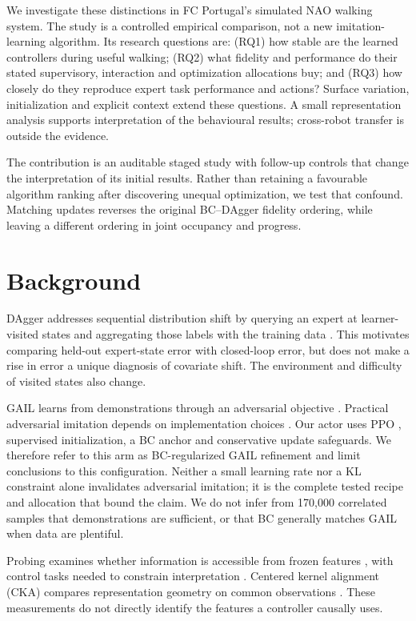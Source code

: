 \documentclass[conference]{IEEEtran}
\begin{document}
We investigate these distinctions in FC Portugal's simulated NAO walking system. The study is a controlled empirical comparison, not a new imitation-learning algorithm. Its research questions are: (RQ1) how stable are the learned controllers during useful walking; (RQ2) what fidelity and performance do their stated supervisory, interaction and optimization allocations buy; and (RQ3) how closely do they reproduce expert task performance and actions? Surface variation, initialization and explicit context extend these questions. A small representation analysis supports interpretation of the behavioural results; cross-robot transfer is outside the evidence.

The contribution is an auditable staged study with follow-up controls that change the interpretation of its initial results. Rather than retaining a favourable algorithm ranking after discovering unequal optimization, we test that confound. Matching updates reverses the original BC--DAgger fidelity ordering, while leaving a different ordering in joint occupancy and progress.

\section{Background}

DAgger addresses sequential distribution shift by querying an expert at learner-visited states and aggregating those labels with the training data \citep{ross2011}. This motivates comparing held-out expert-state error with closed-loop error, but does not make a rise in error a unique diagnosis of covariate shift. The environment and difficulty of visited states also change.

GAIL learns from demonstrations through an adversarial objective \citep{ho2016}. Practical adversarial imitation depends on implementation choices \citep{orsini2021}. Our actor uses PPO \citep{schulman2017}, supervised initialization, a BC anchor and conservative update safeguards. We therefore refer to this arm as BC-regularized GAIL refinement and limit conclusions to this configuration. Neither a small learning rate nor a KL constraint alone invalidates adversarial imitation; it is the complete tested recipe and allocation that bound the claim. We do not infer from 170,000 correlated samples that demonstrations are sufficient, or that BC generally matches GAIL when data are plentiful.

Probing examines whether information is accessible from frozen features \citep{alain2016}, with control tasks needed to constrain interpretation \citep{hewitt2019}. Centered kernel alignment (CKA) compares representation geometry on common observations \citep{kornblith2019}. These measurements do not directly identify the features a controller causally uses.
\end{document}
